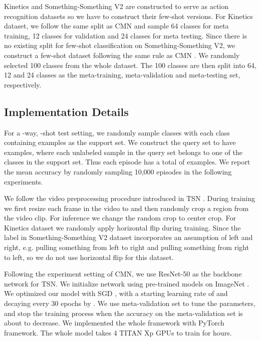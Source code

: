 \documentclass[10pt,twocolumn,letterpaper]{article}
\begin{document}
Kinetics \cite{kay2017kinetics} and Something-Something V2 \cite{goyal2017something} are constructed to serve as action recognition datasets so we have to construct their few-shot versions. For Kinetics dataset, we follow the same split as CMN \cite{zhu2018compound} and sample 64 classes for meta training, 12 classes for validation and 24 classes for meta testing. Since there is no existing split for few-shot classification on Something-Something V2, we construct a few-shot dataset following the same rule as CMN \cite{zhu2018compound}. We randomly selected 100 classes from the whole dataset. The 100 classes are then split into 64, 12 and 24 classes as the meta-training, meta-validation and meta-testing set, respectively.

\subsection{Implementation Details}

For a -way, -shot test setting, we randomly sample  classes with each class containing  examples as the support set. We construct the query set to have  examples, where each unlabeled sample in the query set belongs to one of the  classes in the support set. Thus each episode has a total of  examples. We report the mean accuracy by randomly sampling 10,000 episodes in the following experiments.

We follow the video preprocessing procedure introduced in TSN \cite{wang2016temporal}. During training we first resize each frame in the video to  and then randomly crop a  region from the video clip. For inference we change the random crop to center crop. For Kinetics dataset we randomly apply horizontal flip during training. Since the label in Something-Something V2 dataset incorporates an assumption of left and right, e.g. pulling something from left to right and pulling something from right to left, so we do not use horizontal flip for this dataset.

Following the experiment setting of CMN, we use ResNet-50 \cite{he2016deep} as the backbone network for TSN. We initialize network using pre-trained models on ImageNet \cite{deng2009imagenet}. We optimized our model with SGD \cite{bottou2010large}, with a starting learning rate of  and decaying every 30 epochs by . We use meta-validation set to tune the parameters, and stop the training process when the accuracy on the meta-validation set is about to decrease. We implemented the whole framework with PyTorch \cite{paszke2017automatic} framework. The whole model takes 4 TITAN Xp GPUs to train for  hours.
\end{document}
